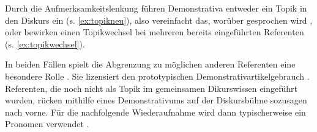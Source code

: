 \noindent
Durch die Aufmerksamkeitslenkung führen Demonstrativa entweder ein Topik in den Diskurs ein (s. \ref{ex:topikneu}), also vereinfacht das, worüber gesprochen wird \parencite{Jacobs2001}, oder bewirken einen Topikwechsel bei mehreren bereits eingeführten Referenten (s. \ref{ex:topikwechsel}). 

\begin{exe}
	\ex 
	\begin{xlist} \label{ex:proto-dem}
		\ex \label{ex:topikneu} 
		\ex \label{ex:topikwechsel}   
		\end{xlist}
\end{exe}

\noindent
In beiden Fällen spielt die Abgrenzung zu möglichen anderen Referenten eine besondere Rolle \parencite[80]{Bisle-Muller1991}. Sie lizensiert den prototypischen Demonstrativartikelgebrauch \parencite[s. auch][]{Schlachter2015}. Referenten, die noch nicht als Topik im gemeinsamen Dikurswissen eingeführt wurden, rücken mithilfe eines Demonstrativums auf der Diskursbühne sozusagen nach vorne. Für die nachfolgende Wiederaufnahme wird dann typischerweise ein Pronomen verwendet \parencite[297]{Gundel1993}. 

